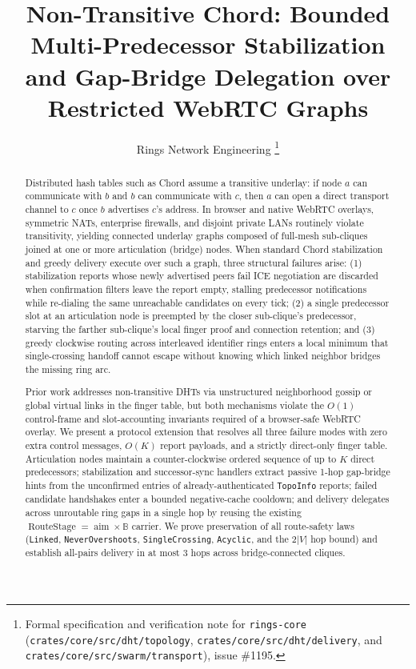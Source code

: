 \documentclass[journal]{IEEEtran}
\title{Non-Transitive Chord: Bounded Multi-Predecessor Stabilization and Gap-Bridge Delegation over Restricted WebRTC Graphs}
\author{Rings Network Engineering%
\thanks{Formal specification and verification note for \texttt{rings-core}
(\texttt{crates/core/src/dht/topology}, \texttt{crates/core/src/dht/delivery},
and \texttt{crates/core/src/swarm/transport}), issue \#1195.}}
\newcommand{\Aim}{\operatorname{aim}}
\newcommand{\RouteStage}{\operatorname{RouteStage}}
\begin{document}
\maketitle

\begin{abstract}
Distributed hash tables such as Chord assume a transitive underlay: if node $a$
can communicate with $b$ and $b$ can communicate with $c$, then $a$ can open a
direct transport channel to $c$ once $b$ advertises $c$'s address. In browser
and native WebRTC overlays, symmetric NATs, enterprise firewalls, and disjoint
private LANs routinely violate transitivity, yielding connected underlay graphs
composed of full-mesh sub-cliques joined at one or more articulation (bridge)
nodes. When standard Chord stabilization and greedy delivery execute over such a
graph, three structural failures arise: (1) stabilization reports whose newly
advertised peers fail ICE negotiation are discarded when confirmation filters
leave the report empty, stalling predecessor notifications while re-dialing the
same unreachable candidates on every tick; (2) a single predecessor slot at an
articulation node is preempted by the closer sub-clique's predecessor, starving
the farther sub-clique's local finger proof and connection retention; and (3)
greedy clockwise routing across interleaved identifier rings enters a local
minimum that single-crossing handoff cannot escape without knowing which linked
neighbor bridges the missing ring arc.

Prior work addresses non-transitive DHTs via unstructured neighborhood gossip
or global virtual links in the finger table, but both mechanisms violate the
$O(1)$ control-frame and slot-accounting invariants required of a browser-safe
WebRTC overlay. We present a protocol extension that resolves all three failure
modes with zero extra control messages, $O(K)$ report payloads, and a strictly
direct-only finger table. Articulation nodes maintain a counter-clockwise
ordered sequence of up to $K$ direct predecessors; stabilization and
successor-sync handlers extract passive 1-hop gap-bridge hints from the
unconfirmed entries of already-authenticated \texttt{TopoInfo} reports; failed
candidate handshakes enter a bounded negative-cache cooldown; and delivery
delegates across unroutable ring gaps in a single hop by reusing the existing
$\RouteStage = \Aim \times \mathbb{B}$ carrier. We prove preservation of all
route-safety laws (\texttt{Linked}, \texttt{NeverOvershoots},
\texttt{SingleCrossing}, \texttt{Acyclic}, and the $2|V|$ hop bound) and
establish all-pairs delivery in at most $3$ hops across bridge-connected
cliques.
\end{abstract}
\end{document}

